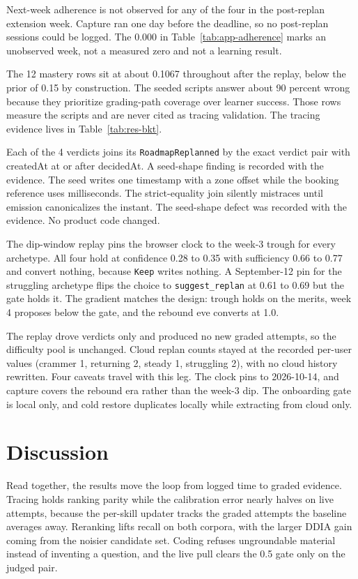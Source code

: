 Next-week adherence is not observed for any of the four in the post-replan extension week. Capture ran one day before the deadline, so no post-replan sessions could be logged. The 0.000 in Table~\ref{tab:app-adherence} marks an unobserved week, not a measured zero and not a learning result.

The 12 mastery rows sit at about 0.1067 throughout after the replay, below the prior of 0.15 by construction. The seeded scripts answer about 90 percent wrong because they prioritize grading-path coverage over learner success. Those rows measure the scripts and are never cited as tracing validation. The tracing evidence lives in Table~\ref{tab:res-bkt}.

Each of the 4 verdicts joins its \texttt{RoadmapReplanned} by the exact verdict pair with createdAt at or after decidedAt. A seed-shape finding is recorded with the evidence. The seed writes one timestamp with a zone offset while the booking reference uses milliseconds. The strict-equality join silently mistraces until emission canonicalizes the instant. The seed-shape defect was recorded with the evidence. No product code changed.

The dip-window replay pins the browser clock to the week-3 trough for every archetype. All four hold at confidence 0.28 to 0.35 with sufficiency 0.66 to 0.77 and convert nothing, because \texttt{Keep} writes nothing. A September-12 pin for the struggling archetype flips the choice to \texttt{suggest\_replan} at 0.61 to 0.69 but the gate holds it. The gradient matches the design: trough holds on the merits, week 4 proposes below the gate, and the rebound eve converts at 1.0.

The replay drove verdicts only and produced no new graded attempts, so the difficulty pool is unchanged. Cloud replan counts stayed at the recorded per-user values (crammer 1, returning 2, steady 1, struggling 2), with no cloud history rewritten. Four caveats travel with this leg. The clock pins to 2026-10-14, and capture covers the rebound era rather than the week-3 dip. The onboarding gate is local only, and cold restore duplicates locally while extracting from cloud only.

\section{Discussion}
Read together, the results move the loop from logged time to graded evidence. Tracing holds ranking parity while the calibration error nearly halves on live attempts, because the per-skill updater tracks the graded attempts the baseline averages away. Reranking lifts recall on both corpora, with the larger DDIA gain coming from the noisier candidate set. Coding refuses ungroundable material instead of inventing a question, and the live pull clears the 0.5 gate only on the judged pair.

